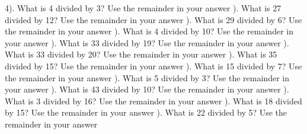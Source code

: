 \documentclass{article}%
\begin{document}
4). What is 4 divided by 3? Use the remainder in your answer%
\newline%
\newline%
). What is 27 divided by 12? Use the remainder in your answer%
\newline%
\newline%
). What is 29 divided by 6? Use the remainder in your answer%
\newline%
\newline%
). What is 4 divided by 10? Use the remainder in your answer%
\newline%
\newline%
). What is 33 divided by 19? Use the remainder in your answer%
\newline%
\newline%
). What is 33 divided by 20? Use the remainder in your answer%
\newline%
\newline%
). What is 35 divided by 15? Use the remainder in your answer%
\newline%
\newline%
). What is 15 divided by 7? Use the remainder in your answer%
\newline%
\newline%
). What is 5 divided by 3? Use the remainder in your answer%
\newline%
\newline%
). What is 43 divided by 10? Use the remainder in your answer%
\newline%
\newline%
). What is 3 divided by 16? Use the remainder in your answer%
\newline%
\newline%
). What is 18 divided by 15? Use the remainder in your answer%
\newline%
\newline%
). What is 22 divided by 5? Use the remainder in your answer%
\end{document}
